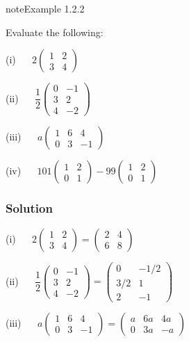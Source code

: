 \documentclass[letterpaper,10pt,english]{jupyterBook}
\begin{document}
\begin{sphinxadmonition}{note}{Example 1.2.2}



\sphinxAtStartPar
Evaluate the following:

\sphinxAtStartPar
(i)   \(2 \begin{pmatrix} 1 & 2 \\ 3 & 4 \end{pmatrix}\)

\sphinxAtStartPar
(ii)   \(\dfrac{1}{2} \begin{pmatrix} 0 & -1 \\ 3 & 2 \\ 4  &-2  \end{pmatrix}\)

\sphinxAtStartPar
(iii)   \(a \begin{pmatrix} 1 & 6 & 4 \\ 0 & 3 & -1 \end{pmatrix}\)

\sphinxAtStartPar
(iv)   \(101 \begin{pmatrix} 1 & 2 \\ 0 & 1 \end{pmatrix} - 99 \begin{pmatrix} 1 & 2 \\ 0 & 1 \end{pmatrix}\)
\subsubsection*{Solution}

\sphinxAtStartPar
(i)   \( 2 \begin{pmatrix} 1 & 2 \\ 3 & 4 \end{pmatrix} = \begin{pmatrix} 2 & 4 \\ 6 & 8 \end{pmatrix} \)

\sphinxAtStartPar
(ii)   \(\dfrac{1}{2} \begin{pmatrix} 0 & -1 \\ 3 & 2 \\ 4  &-2  \end{pmatrix} = \begin{pmatrix} 0 & -1/2 \\ 3/2 & 1 \\ 2 & -1 \end{pmatrix} \)

\sphinxAtStartPar
(iii)   \(a \begin{pmatrix} 1 & 6 & 4 \\ 0 & 3 & -1 \end{pmatrix} = \begin{pmatrix} a & 6a & 4a \\ 0 & 3a & -a \end{pmatrix} \)


\end{sphinxadmonition}
\end{document}
